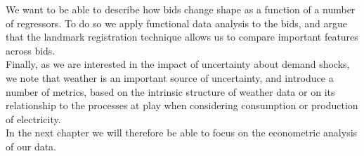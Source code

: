 We want to be able to describe how bids change shape as a function of a number of regressors. To do so we apply functional data analysis to the bids, and argue that the landmark registration technique allows us to compare important features across bids. \\

Finally, as we are interested in the impact of uncertainty about demand shocks, we note that weather is an important source of uncertainty, and introduce a number of metrics, based on the intrinsic structure of weather data or on its relationship to the processes at play when considering consumption or production of electricity. \\

In the next chapter we will therefore be able to focus on the econometric analysis of our data. 

